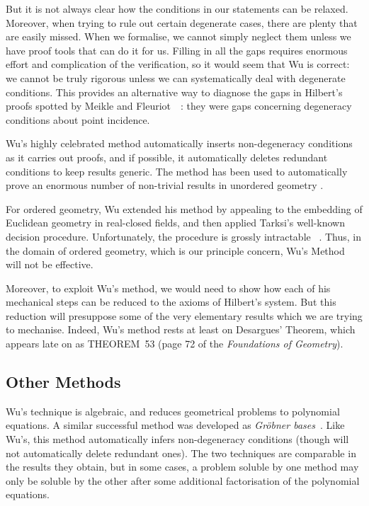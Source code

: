 But it is not always clear how the conditions in our statements can be relaxed. Moreover, when trying to rule out certain degenerate cases, there are plenty that are easily missed. When we formalise, we cannot simply neglect them unless we have proof tools that can do it for us. Filling in all the gaps requires enormous effort and complication of the verification, so it would seem that Wu is correct: we cannot be truly rigorous unless we can systematically deal with degenerate conditions. This provides an alternative way to diagnose the gaps in Hilbert's proofs spotted by Meikle and Fleuriot~~\cite{MeikleFleuriotFormalizingHilbert}: they were gaps concerning degeneracy conditions about point incidence.

Wu's highly celebrated method automatically inserts non-degeneracy conditions as it carries out proofs, and if possible, it automatically deletes redundant conditions to keep results generic. The method has been used to automatically prove an enormous number of non-trivial results in unordered geometry \cite{MechanicalGeometryTheoremProving}.

For ordered geometry, Wu extended his method by appealing to the embedding of Euclidean geometry in real-closed fields, and then applied Tarksi's well-known decision procedure. Unfortunately, the procedure is grossly intractable ~\cite{TarksiMcNaugtonReview}. Thus, in the domain of ordered geometry, which is our principle concern, Wu's Method will not be effective.

Moreover, to exploit Wu's method, we would need to show how each of his mechanical steps can be reduced to the axioms of Hilbert's system. But this reduction will presuppose some of the very elementary results which we are trying to mechanise. Indeed, Wu's method rests at least on Desargues' Theorem, which appears late on as THEOREM~53 (page 72 of the \emph{Foundations of Geometry}).

\subsection{Other Methods}
Wu's technique is algebraic, and reduces geometrical problems to polynomial equations. A similar successful method was developed as \emph{Gr\"{o}bner bases}~\cite{BuchbergerGrobner}. Like Wu's, this method automatically infers non-degeneracy conditions (though will not automatically delete redundant ones). The two techniques are comparable in the results they obtain, but in some cases, a problem soluble by one method may only be soluble by the other after some additional factorisation of the polynomial equations.

